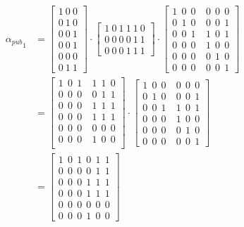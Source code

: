 \begin{equation}\label{eq:ej-alpha-pub-1}
	\begin{aligned}
	{{\alpha_{pub}}_1}  & =  
	\left[\begin{array}{c}
		1\ 0\ 0\\
		0\ 1\ 0\\
		0\ 0\ 1\\
		\hline
		0\ 0\ 1\\
		0\ 0\ 0\\
		0\ 1\ 1
	\end{array}\right]
	\cdot
	\left[\begin{array}{c}
		1\ 0\ 1\ 1\ 1\ 0\\
		0\ 0\ 0\ 0\ 1\ 1\\
		0\ 0\ 0\ 1\ 1\ 1
	\end{array}\right]
	\cdot
	\left[\begin{array}{c|c}
		1\ \ 0\ \ 0\ & 0\ \ 0\ \ 0\\
		0\ \ 1\ \ 0\ & 0\ \ 0\ \ 1\\
		0\ \ 0\ \ 1\ & 1\ \ 0\ \ 1\\
		\hline
		0\ \ 0\ \ 0\ & 1\ \ 0\ \ 0\\
		0\ \ 0\ \ 0\ & 0\ \ 1\ \ 0\\
		0\ \ 0\ \ 0\ & 0\ \ 0\ \ 1
	\end{array}\right] \\
	& = \left[\begin{array}{c|c}
		1\ \ 0\ \ 1\ & 1\ \ 1\ \ 0\\
		0\ \ 0\ \ 0\ & 0\ \ 1\ \ 1\\
		0\ \ 0\ \ 0\ & 1\ \ 1\ \ 1\\
		\hline
		0\ \ 0\ \ 0\ & 1\ \ 1\ \ 1\\
		0\ \ 0\ \ 0\ & 0\ \ 0\ \ 0\\
		0\ \ 0\ \ 0\ & 1\ \ 0\ \ 0\\
	\end{array}\right]
	\cdot
	\left[\begin{array}{c|c}
		1\ \ 0\ \ 0\ & 0\ \ 0\ \ 0\\
		0\ \ 1\ \ 0\ & 0\ \ 0\ \ 1\\
		0\ \ 0\ \ 1\ & 1\ \ 0\ \ 1\\
		\hline
		0\ \ 0\ \ 0\ & 1\ \ 0\ \ 0\\
		0\ \ 0\ \ 0\ & 0\ \ 1\ \ 0\\
		0\ \ 0\ \ 0\ & 0\ \ 0\ \ 1
	\end{array}\right]\\
	& = \left[\begin{array}{c}
		1\ \ 0\ \ 1\ \ 0\ \ 1\ \ 1\\
		0\ \ 0\ \ 0\ \ 0\ \ 1\ \ 1\\
		0\ \ 0\ \ 0\ \ 1\ \ 1\ \ 1\\
		0\ \ 0\ \ 0\ \ 1\ \ 1\ \ 1\\
		0\ \ 0\ \ 0\ \ 0\ \ 0\ \ 0\\
		0\ \ 0\ \ 0\ \ 1\ \ 0\ \ 0
	\end{array}\right]
	\end{aligned}
\end{equation}

